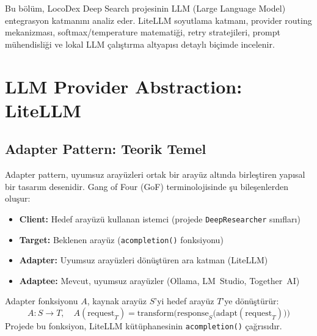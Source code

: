 
Bu b\"{o}l\"{u}m, LocoDex Deep Search projesinin LLM (Large Language Model) entegrasyon katman{\i}n{\i} analiz eder. LiteLLM soyutlama kat\-man{\i}, provider routing mekanizmas{\i}, softmax/temperature matemati\u{g}i, retry stratejileri, prompt m\"{u}hendisli\u{g}i ve lokal LLM \c{c}al{\i}\c{s}t{\i}rma altyap{\i}s{\i} detayl{\i} bi\c{c}imde incelenir.

\section{LLM Provider Abstraction: LiteLLM}
\label{sec:litellm}

\subsection{Adapter Pattern: Teorik Temel}
\label{sec:adapter-pattern}

Adapter pattern, uyumsuz aray\"{u}zleri ortak bir aray\"{u}z alt{\i}nda birle\c{s}tiren yap{\i}sal bir tasar{\i}m desenidir. Gang of Four (GoF) terminolojisinde \c{s}u bile\c{s}enlerden olu\c{s}ur:

\begin{itemize}
  \item \textbf{Client:} Hedef aray\"{u}z\"{u} kullanan istemci (projede \texttt{DeepResearcher} s{\i}n{\i}flar{\i})
  \item \textbf{Target:} Beklenen aray\"{u}z (\texttt{acompletion()} fonksiyonu)
  \item \textbf{Adapter:} Uyumsuz aray\"{u}zleri d\"{o}n\"{u}\c{s}t\"{u}ren ara katman (LiteLLM)
  \item \textbf{Adaptee:} Mevcut, uyumsuz aray\"{u}zler (Ollama, LM~Studio, Together~AI)
\end{itemize}

\begin{formulbox}
Adapter fonksiyonu $A$, kaynak aray\"{u}z $S$'yi hedef aray\"{u}z $T$'ye d\"{o}n\"{u}\c{s}t\"{u}r\"{u}r:
\begin{equation}
A: S \to T, \quad A(\mathrm{request}_T) = \mathrm{transform}\bigl(\mathrm{response}_S\bigl(\mathrm{adapt}(\mathrm{request}_T)\bigr)\bigr)
\label{eq:adapter}
\end{equation}
Projede bu fonksiyon, LiteLLM k\"{u}t\"{u}phanesinin \texttt{acompletion()} \c{c}a\u{g}r{\i}s{\i}d{\i}r.
\end{formulbox}


